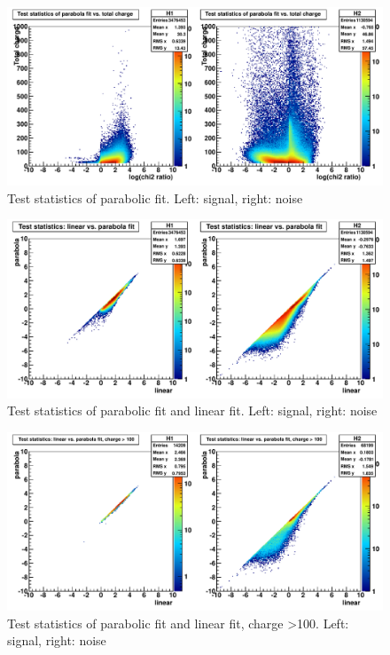 \begin{figure}
\includegraphics[width=120mm]{DailyLog/6321/6321HTestStatisticsParabolaVsTotalCharge.pdf}
\caption{Test statistics of parabolic fit.  Left: signal, right: noise}
\label{Figure_6321HTestStatisticsParabolaVsTotalCharge}
\end{figure}

\begin{figure}
\includegraphics[width=120mm]{DailyLog/6321/6321HTestStatisticsLinearVsParabola.pdf}
\caption{Test statistics of parabolic fit and linear fit.  Left: signal, right: noise}
\label{Figure_6321HTestStatisticsLinearVsParabola}
\end{figure}

\begin{figure}
\includegraphics[width=120mm]{DailyLog/6321/6321HTestStatisticsLinearVsParabola100.pdf}
\caption{Test statistics of parabolic fit and linear fit, charge \textgreater 100.  Left: signal, right: noise}
\label{Figure_6321HTestStatisticsLinearVsParabola100}
\end{figure}



